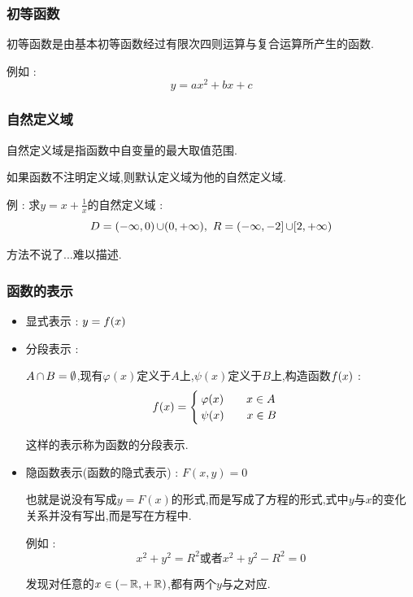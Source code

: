{{\subsubsection{初等函数}{
    初等函数是由基本初等函数经过有限次四则运算与复合运算所产生的函数.

    例如 : $$
        y = ax^2 + bx + c
    $$
}%

\subsubsection{自然定义域}{
自然定义域是指函数中自变量的最大取值范围.

如果函数不注明定义域,则默认定义域为他的自然定义域.

例 : 求$y = x + \frac{1}{x}$的自然定义域 : $$
    D = (-\infty,0) \operatorname{\cup} (0,+\infty),\ R = (-\infty,-2] \operatorname{\cup} [2,+\infty)
$$

方法不说了...难以描述.
}%

\subsubsection{函数的表示}{
    \begin{itemize}
        \item 显式表示 : $y = f(x)$
        \item {
              分段表示 :

              $A \operatorname{\cap} B = \emptyset$,现有$\varphi(x)$定义于$A$上,$\psi(x)$定义于$B$上,构造函数$f(x)$ : $$
                  f(x) = \begin{cases}
                      \varphi(x)\qquad x \in A \\
                      \psi(x)\qquad x \in B
                  \end{cases}
              $$

              这样的表示称为函数的分段表示.
              }
        \item {
              隐函数表示(函数的隐式表示) : $F(x,y) = 0$

              也就是说没有写成$y = F(x)$的形式,而是写成了方程的形式,式中$y$与$x$的变化关系并没有写出,而是写在方程中.

              例如 : $$
                  x^2 + y^2 = R^2\mbox{或者}x^2 + y^2 - R^2 = 0
              $$

              发现对任意的$x \in (-\operatorname{\mathbb{R}},+\operatorname{\mathbb{R}})$,都有两个$y$与之对应.

}
\end{itemize}}}}
